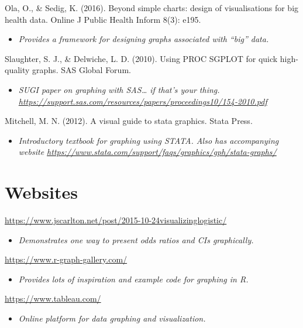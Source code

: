 \documentclass[
]{book}
\providecommand{\tightlist}{%
  \setlength{\itemsep}{0pt}\setlength{\parskip}{0pt}}
\begin{document}
Ola, O., \& Sedig, K. (2016). Beyond simple charts: design of visualisations for big health data. Online J Public Health Inform 8(3): e195.

\begin{itemize}
\tightlist
\item
  \emph{Provides a framework for designing graphs associated with ``big'' data.}
\end{itemize}

Slaughter, S. J., \& Delwiche, L. D. (2010). Using PROC SGPLOT for quick high-quality graphs. SAS Global Forum.

\begin{itemize}
\tightlist
\item
  \emph{SUGI paper on graphing with SAS\ldots{} if that's your thing. \url{https://support.sas.com/resources/papers/proceedings10/154-2010.pdf}}
\end{itemize}

Mitchell, M. N. (2012). A visual guide to stata graphics. Stata Press.

\begin{itemize}
\tightlist
\item
  \emph{Introductory textbook for graphing using STATA. Also has accompanying website \url{https://www.stata.com/support/faqs/graphics/gph/stata-graphs/}}
\end{itemize}

\section{Websites}\label{websites-1}

\url{https://www.jscarlton.net/post/2015-10-24visualizinglogistic/}

\begin{itemize}
\tightlist
\item
  \emph{Demonstrates one way to present odds ratios and CIs graphically.}
\end{itemize}

\url{https://www.r-graph-gallery.com/}

\begin{itemize}
\tightlist
\item
  \emph{Provides lots of inspiration and example code for graphing in R.}
\end{itemize}

\url{https://www.tableau.com/}

\begin{itemize}
\tightlist
\item
  \emph{Online platform for data graphing and visualization.}
\end{itemize}
\end{document}
